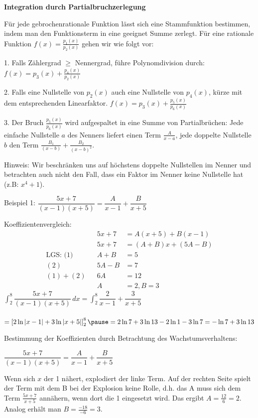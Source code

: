 \begin{frame}[fragile]
\textbf{Integration durch Partialbruchzerlegung}

Für jede gebrochenrationale Funktion lässt sich eine Stammfunktion bestimmen, indem man den Funktionsterm in eine geeignet Summe zerlegt. \pause Für eine rationale Funktion $f(x) = \frac{p_1(x)}{p_2(x)}$ gehen wir wie folgt vor:

1. Falls Zählergrad $\ge$ Nennergrad, führe Polynomdivision durch: $f(x) = p_3(x) + \frac{p_4(x)}{p_2(x)}$ \pause

2. Falls eine Nullstelle von $p_2(x)$ auch eine Nullstelle von $p_4(x)$, kürze mit dem entsprechenden Linearfaktor.
$f(x) = p_3(x) + \frac{p_5(x)}{p_6(x)}$ \pause

3. Der Bruch  $\frac{p_5(x)}{p_6(x)}$ wird aufgespaltet in eine Summe von Partialbrüchen: Jede einfache Nullstelle $a$ des Nenners liefert einen Term $\frac{A}{x-a}$, jede doppelte Nullstelle $b$ den Term $\frac{B_1}{(x-b)} + \frac{B_2}{(x-b)^2}$. \pause

\footnotesize
Hinweis: Wir beschränken uns auf höchstens doppelte Nullstellen im Nenner und betrachten auch nicht den Fall, dass ein Faktor im Nenner keine Nullstelle hat (z.B: $x^4+1$).


 
 \end{frame}
 
 
\begin{frame}[fragile]
Beispiel 1: $\dfrac{5x+7}{(x-1)(x+5)} = \dfrac{A}{x-1} + \dfrac{B}{x+5}$ \pause
 
 Koeffizientenvergleich: 
\begin{align*} 
& &5x+7 &= A(x+5)+B(x-1) \\  
& &5x+7 &= (A+B)x+(5A-B) \\
\text{LGS: (1)}& &A+B &= 5 \\
(2)& &5A-B &= 7 \\
(1)+(2)& &6A &= 12 \\
& &A &= 2, B= 3
\end{align*}  \pause
$\displaystyle\int_2^8 \dfrac{5x+7}{(x-1)(x+5)}\,dx =  \displaystyle\int_2^8 \dfrac{2}{x-1} + \dfrac{3}{x+5}$ \pause
\\~\\
$=\left[2\ln\left|x-1\right|+3\ln\left|x+5\right|\right]_2^8 \pause = 2\ln 7 + 3 \ln13 - 2 \ln1 -3 \ln 7 = -\ln7+3\ln13 $
\end{frame}
 

\begin{frame}[fragile]
Bestimmung der Koeffizienten durch Betrachtung des Wachstumsverhaltens:

  $\dfrac{5x+7}{(x-1)(x+5)} = \dfrac{A}{x-1} + \dfrac{B}{x+5}$ \pause
 
Wenn sich $x$ der 1 nähert, explodiert der linke Term. \pause Auf der rechten Seite spielt der Term mit dem B bei der Explosion keine Rolle, d.h. das A muss sich dem Term $\frac{5x+7}{x+5}$ annähern, wenn dort die 1 eingesetzt wird. \pause Das ergibt $A = \frac{12}{6} = 2$. \pause Analog erhält man $B = \frac{-18}{-6} = 3$.
 \end{frame}
 
